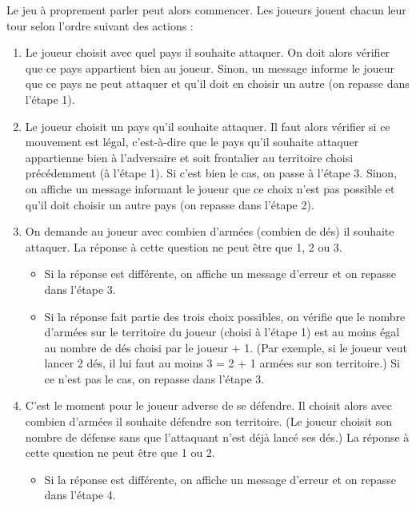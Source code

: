 \vspace{0.3cm}
Le jeu à proprement parler peut alors commencer. Les joueurs jouent chacun leur tour selon l'ordre suivant des actions :
\begin{enumerate}
    \item Le joueur choisit avec quel pays il souhaite attaquer. On doit alors vérifier que ce pays appartient bien au joueur. Sinon, un message informe le joueur que ce pays ne peut attaquer et qu'il doit en choisir un autre (on repasse dans l'étape 1).
    \vspace{0.2cm}
    \item Le joueur choisit un pays qu'il souhaite attaquer. Il faut alors vérifier si ce mouvement est légal, c'est-à-dire que le pays qu'il souhaite attaquer appartienne bien à l'adversaire et soit frontalier au territoire choisi précédemment (à l'étape 1). Si c'est bien le cas, on passe à l'étape 3. Sinon, on affiche un message informant le joueur que ce choix n'est pas possible et qu'il doit choisir un autre pays (on repasse dans l'étape 2).
    \vspace{0.2cm}
    \item On demande au joueur avec combien d'armées (combien de dés) il souhaite attaquer. La réponse à cette question ne peut être que 1, 2 ou 3.
    \begin{itemize}
        \item Si la réponse est différente, on affiche un message d'erreur et on repasse dans l'étape 3.
        \item Si la réponse fait partie des trois choix possibles, on vérifie que le nombre d'armées sur le territoire du joueur (choisi à l'étape 1) est au moins égal au nombre de dés choisi par le joueur + 1. (Par exemple, si le joueur veut lancer 2 dés, il lui faut au moins 3 = 2 + 1 armées sur son territoire.) Si ce n'est pas le cas, on repasse dans l'étape 3.
    \end{itemize}
    \vspace{0.2cm}
    \item C'est le moment pour le joueur adverse de se défendre. Il choisit alors avec combien d'armées il souhaite défendre son territoire. (Le joueur choisit son nombre de défense sans que l'attaquant n'est déjà lancé ses dés.) La réponse à cette question ne peut être que 1 ou 2. 
    \begin{itemize}
        \item Si la réponse est différente, on affiche un message d'erreur et on repasse dans l'étape 4.

\end{itemize}
\end{enumerate}
